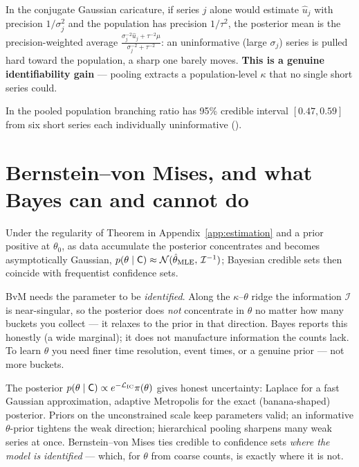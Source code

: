 \begin{intuitionbox}
In the conjugate Gaussian caricature, if series $j$ alone would estimate
$\hat u_j$ with precision $1/\sigma_j^2$ and the population has precision
$1/\tau^2$, the posterior mean is the precision-weighted average
$\frac{\sigma_j^{-2}\hat u_j+\tau^{-2}\mu}{\sigma_j^{-2}+\tau^{-2}}$: an
uninformative (large $\sigma_j$) series is pulled hard toward the population, a
sharp one barely moves. \textbf{This is a genuine identifiability gain} --- pooling
extracts a population-level $\kappa$ that no single short series could.
\end{intuitionbox}

In  the pooled population branching ratio has 95\% credible interval
$[0.47,0.59]$ from six short series each individually uninformative
().

\section{Bernstein--von Mises, and what Bayes can and cannot do}

\begin{theorem}\label{thm:ch7b-bvm}
Under the regularity of Theorem in Appendix~\ref{app:estimation} and a prior
positive at $\theta_0$, as data accumulate the posterior concentrates and becomes
asymptotically Gaussian, $p(\theta\mid\mathsf{C})\approx\mathcal N(\hat\theta_{\mathrm{MLE}},\,\mathcal I^{-1})$;
Bayesian credible sets then coincide with frequentist confidence sets.
\end{theorem}

\begin{pitfall}
BvM needs the parameter to be \emph{identified}. Along the $\kappa$--$\theta$ ridge
the information $\mathcal I$ is near-singular, so the posterior does \emph{not}
concentrate in $\theta$ no matter how many buckets you collect --- it relaxes to the
prior in that direction. Bayes reports this honestly (a wide marginal); it does not
manufacture information the counts lack. To learn $\theta$ you need finer time
resolution, event times, or a genuine prior --- not more buckets.
\end{pitfall}

\begin{recap}
The posterior $p(\theta\mid\mathsf{C})\propto e^{-\mathcal L_{\mathrm{IC}}}\pi(\theta)$
gives honest uncertainty: Laplace for a fast Gaussian approximation, adaptive
Metropolis for the exact (banana-shaped) posterior. Priors on the unconstrained
scale keep parameters valid; an informative $\theta$-prior tightens the weak
direction; hierarchical pooling sharpens many weak series at once. Bernstein--von
Mises ties credible to confidence sets \emph{where the model is identified} ---
which, for $\theta$ from coarse counts, is exactly where it is not.
\end{recap}

